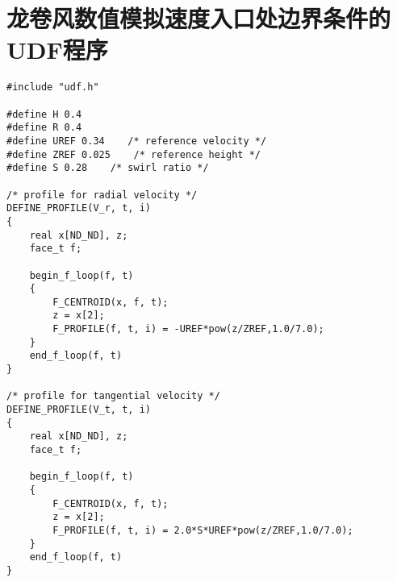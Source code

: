 \chapter{龙卷风数值模拟速度入口处边界条件的UDF程序}\label{apen:udf}
\begin{verbatim}
#include "udf.h"

#define H 0.4
#define R 0.4
#define UREF 0.34    /* reference velocity */
#define ZREF 0.025    /* reference height */
#define S 0.28    /* swirl ratio */

/* profile for radial velocity */
DEFINE_PROFILE(V_r, t, i)
{
    real x[ND_ND], z;
    face_t f;

    begin_f_loop(f, t)
    {
        F_CENTROID(x, f, t);
        z = x[2];
        F_PROFILE(f, t, i) = -UREF*pow(z/ZREF,1.0/7.0);
    }
    end_f_loop(f, t)
}

/* profile for tangential velocity */
DEFINE_PROFILE(V_t, t, i)
{
    real x[ND_ND], z;
    face_t f;

    begin_f_loop(f, t)
    {
        F_CENTROID(x, f, t);
        z = x[2];
        F_PROFILE(f, t, i) = 2.0*S*UREF*pow(z/ZREF,1.0/7.0);
    }
    end_f_loop(f, t)
}

\end{verbatim}
